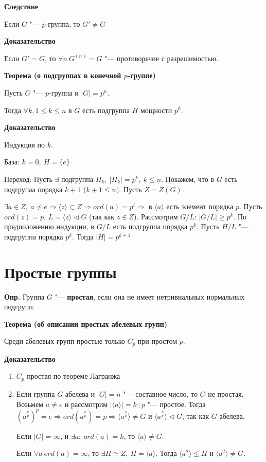\documentclass{article}
\begin{document}
\vspace{10pt}

\textbf{Следствие}

Если $G$ "--- $p$-группа, то $G' \neq G$

\textbf{Доказательство}

Если $G' = G$, то $\forall n \  G^{(n)} = G$ "--- противоречие с разрешимостью.

\vspace{10pt}

\textbf{Теорема (о подгруппах в конечной $p$-группе)}

Пусть $G$ "--- $p$-группа и $|G| = p^n$.

Тогда $\forall k, 1 \leq k \leq n$ в $G$ есть подгруппа $H$ мощности $p^k$.

\textbf{Доказательство}

Индукция по $k$.

База: $k = 0, \  H = \{e\}$

Переход: Пусть $\exists$ подгруппа $H_k, \  |H_k| = p^k, \  k \leq n$. Покажем, что в $G$ есть подгрупаа порядка $k+1$ ($k + 1 \leq n)$. Пусть $Z = Z(G)$.

$\exists a \in Z, \  a \neq e \Rightarrow \langle z \rangle \subset Z \Rightarrow ord(a) = p^l \Rightarrow$ в $\langle a \rangle$ есть элемент порядка $p$. Пусть $ord(z) = p$. $L = \langle z \rangle \triangleleft G$ (так как $z \in Z$). Рассмотрим $G/L$: $|G/L| \geq p^k$. По предположению индукции, в $G/L$ есть подгруппа порядка $p^k$. Пусть $H/L$ "--- подгруппа порядка $p^k$. Тогда $|H| = p^{k+1}$

\section{Простые группы}

\textbf{Опр.} Группа $G$ "--- \textbf{простая}, если она не имеет нетривиальных нормальных подгрупп.

\vspace{5pt}

\textbf{Теорема (об описании простых абелевых групп)}

Среди абелевых групп простые только $C_p$ при простом $p$.

\textbf{Доказательство}
\begin{enumerate}
	\item $C_p$ простая по теореме Лагранжа
	\item Если группа $G$ абелева и $|G| = n$ "--- составное число, то $G$ не простая. Возьмем $a \neq e$ и рассмотрим $|\langle a \rangle| = k \  \vdots \  p$ "--- простое. Тогда $(a^{\frac{k}{p}})^p = e \Rightarrow ord(a^{\frac{k}{p}}) = p \Rightarrow \langle a^{\frac{k}{p}} \rangle \neq G$ и $\langle a^{\frac{k}{p}} \rangle \triangleleft G$, так как $G$ абелева.
	
	Если $|G| = \infty$, и $\exists a: \  ord(a) = k$, то $\langle a \rangle \neq G$.
	
	Если $\forall a \  ord(a) = \infty$, то $\exists H \simeq Z, \  H = \langle a \rangle$. Тогда $\langle a^2 \rangle \leq H$ и $\langle a^2 \rangle \neq G$.
\end{enumerate}
\end{document}
